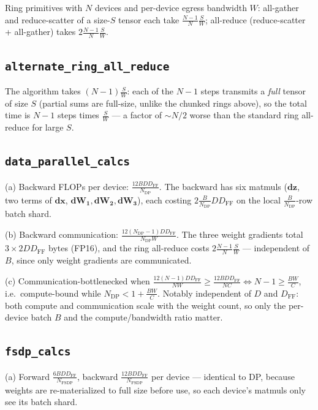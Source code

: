\documentclass[11pt]{article}
\begin{document}
Ring primitives with $N$ devices and per-device egress bandwidth $W$: all-gather and
reduce-scatter of a size-$S$ tensor each take $\frac{N-1}{N}\frac{S}{W}$; all-reduce
(reduce-scatter + all-gather) takes $2\frac{N-1}{N}\frac{S}{W}$.

\subsection{\texttt{alternate\_ring\_all\_reduce}}

The algorithm takes $(N-1)\frac{S}{W}$: each of the $N-1$ steps transmits a \emph{full} tensor of
size $S$ (partial sums are full-size, unlike the chunked rings above), so the total time is $N-1$
steps times $\frac{S}{W}$ --- a factor of ${\sim}N/2$ worse than the standard ring all-reduce for
large $S$.

\subsection{\texttt{data\_parallel\_calcs}}

(a) Backward FLOPs per device: $\frac{12 B D D_{\mathrm{FF}}}{N_{\mathrm{DP}}}$. The backward has
six matmuls ($\bm{dz}$, two terms of $\bm{dx}$, $\bm{dW_1}, \bm{dW_2}, \bm{dW_3}$), each costing
$2\frac{B}{N_{\mathrm{DP}}} D D_{\mathrm{FF}}$ on the local $\frac{B}{N_{\mathrm{DP}}}$-row batch
shard.

(b) Backward communication: $\frac{12(N_{\mathrm{DP}}-1) D D_{\mathrm{FF}}}{N_{\mathrm{DP}} W}$.
The three weight gradients total $3 \times 2 D D_{\mathrm{FF}}$ bytes (FP16), and the ring
all-reduce costs $2\frac{N-1}{N}\frac{S}{W}$ --- independent of $B$, since only weight gradients
are communicated.

(c) Communication-bottlenecked when $\frac{12(N-1)DD_{\mathrm{FF}}}{NW} \ge
\frac{12BDD_{\mathrm{FF}}}{NC} \iff N-1 \ge \frac{BW}{C}$, i.e.\ compute-bound while
$N_{\mathrm{DP}} < 1 + \frac{BW}{C}$. Notably independent of $D$ and $D_{\mathrm{FF}}$: both
compute and communication scale with the weight count, so only the per-device batch $B$ and the
compute/bandwidth ratio matter.

\subsection{\texttt{fsdp\_calcs}}

(a) Forward $\frac{6BDD_{\mathrm{FF}}}{N_{\mathrm{FSDP}}}$, backward
$\frac{12BDD_{\mathrm{FF}}}{N_{\mathrm{FSDP}}}$ per device --- identical to DP, because weights are
re-materialized to full size before use, so each device's matmuls only see its batch shard.
\end{document}
